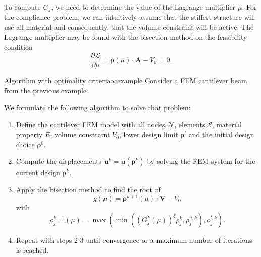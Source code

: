To compute $G_j$, we need to determine the value of the Lagrange multiplier $\mu$. For the compliance problem, we can intuitively assume that the stiffest structure will use all material and consequently, that the volume constraint will be active. The Lagrange multiplier may be found with the bisection method on the feasibility condition
\begin{equation}
    \frac{\partial \mathcal{L}}{\partial \mu} = \pmb{\rho}(\mu) \cdot \mathbf{A} - V_0 = 0.
\end{equation}

\begin{example}{Algorithm with optimality criteria}{ocexample}
    Consider a FEM cantilever beam from the previous example. 

    We formulate the following algorithm to solve that problem: 
    \begin{enumerate}
        \item Define the cantilever FEM model with all nodes $\mathcal{N}$, elements $\mathcal{E}$, material property $E$, volume constraint $V_0$, lower design limit $\pmb{\rho}^l$ and the initial design choice $\pmb{\rho}^0$.
        \item Compute the displacements $\mathbf{u}^k = \mathbf{u}(\pmb{\rho}^k)$ by solving the FEM system for the current design $\pmb{\rho}^k$.
        \item Apply the bisection method to find the root of 
            \begin{equation}
                g(\mu) = \pmb{\rho}^{k+1}(\mu) \cdot \mathbf{V} - V_0
            \end{equation}
        with 
        \begin{equation}
            \rho^{k+1}_j(\mu) = \max \left( \min \left(\left(G_j^k(\mu)\right)^\xi \rho_j^k , \rho_j^{u,k} \right), \rho_j^{l,k} \right).
        \end{equation}
        \item Repeat with steps 2-3 until convergence or a maximum number of iterations is reached.
    \end{enumerate}
\end{example}

    




 